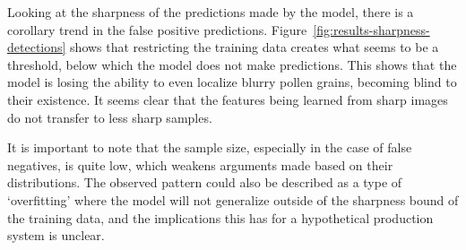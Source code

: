 Looking at the sharpness of the predictions made by the model, there is a corollary trend in the false positive predictions.
Figure~\ref{fig:results-sharpness-detections} shows that restricting the training data creates what seems to be a threshold, below which the model does not make predictions.
This shows that the model is losing the ability to even localize blurry pollen grains, becoming blind to their existence.
It seems clear that the features being learned from sharp images do not transfer to less sharp samples.

It is important to note that the sample size, especially in the case of false negatives, is quite low, which weakens arguments made based on their distributions.
The observed pattern could also be described as a type of `overfitting' where the model will not generalize outside of the sharpness bound of the training data, and the implications this has for a hypothetical production system is unclear.

